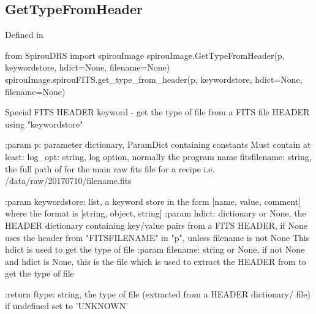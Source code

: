 \noindent\begin{minipage}{\textwidth}
\subsection{GetTypeFromHeader}

Defined in \spirouImage{}

\begin{pythonbox}
from SpirouDRS import spirouImage
spirouImage.GetTypeFromHeader(p, keywordstore, hdict=None, filename=None)
spirouImage.spirouFITS.get_type_from_header(p, keywordstore, hdict=None, filename=None)
\end{pythonbox}

\begin{pythondocstring}
Special FITS HEADER keyword - get the type of file from a FITS file HEADER
using "keywordstore"

:param p: parameter dictionary, ParamDict containing constants
    Must contain at least:
            log_opt: string, log option, normally the program name
            fitsfilename: string, the full path of for the main raw fits
                          file for a recipe
                          i.e. /data/raw/20170710/filename.fits

:param keywordstore: list, a keyword store in the form
                     [name, value, comment] where the format is
                     [string, object, string]
:param hdict: dictionary or None, the HEADER dictionary containing
              key/value pairs from a FITS HEADER, if None uses the
              header from "FITSFILENAME" in "p", unless filename is not None
              This hdict is used to get the type of file
:param filename: string or None, if not None and hdict is None, this is the
                 file which is used to extract the HEADER from to get
                 the type of file

:return ftype: string, the type of file (extracted from a HEADER dictionary/
               file) if undefined set to 'UNKNOWN'
\end{pythondocstring}
\end{minipage}


